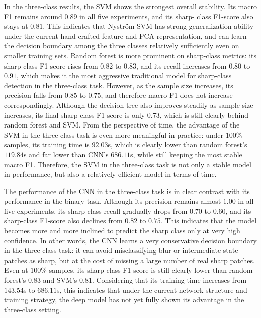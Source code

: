 \par In the three-class results, the SVM shows the strongest overall stability.
Its macro F1 remains around $0.89$ in all five experiments, and its sharp-
class F1-score also stays at $0.81$. This indicates that Nystr\"{o}m-SVM has
strong generalization ability under the current hand-crafted feature and PCA
representation, and can learn the decision boundary among the three classes
relatively sufficiently even on smaller training sets. Random forest is more
prominent on sharp-class metrics: its sharp-class F1-score rises from $0.82$
to $0.83$, and its recall increases from $0.80$ to $0.91$, which makes it the
most aggressive traditional model for sharp-class detection in the three-class
task. However, as the sample size increases, its precision falls from $0.85$
to $0.75$, and therefore macro F1 does not increase correspondingly. Although
the decision tree also improves steadily as sample size increases, its final
sharp-class F1-score is only $0.73$, which is still clearly behind random
forest and SVM. From the perspective of time, the advantage of the SVM in the
three-class task is even more meaningful in practice: under $100\%$ samples,
its training time is $92.03$s, which is clearly lower than random forest's
$119.84$s and far lower than CNN's $686.11$s, while still keeping the most
stable macro F1. Therefore, the SVM in the three-class task is not only a
stable model in performance, but also a relatively efficient model in terms of
time.

\par The performance of the CNN in the three-class task is in clear contrast
with its performance in the binary task. Although its precision remains almost
$1.00$ in all five experiments, its sharp-class recall gradually drops from
$0.70$ to $0.60$, and its sharp-class F1-score also declines from $0.82$ to
$0.75$. This indicates that the model becomes more and more inclined to
predict the sharp class only at very high confidence. In other words, the CNN
learns a very conservative decision boundary in the three-class task: it can
avoid misclassifying blur or intermediate-state patches as sharp, but at the
cost of missing a large number of real sharp patches. Even at $100\%$ samples,
its sharp-class F1-score is still clearly lower than random forest's $0.83$
and SVM's $0.81$. Considering that its training time increases from $143.54$s
to $686.11$s, this indicates that under the current network structure and
training strategy, the deep model has not yet fully shown its advantage in the
three-class setting.

